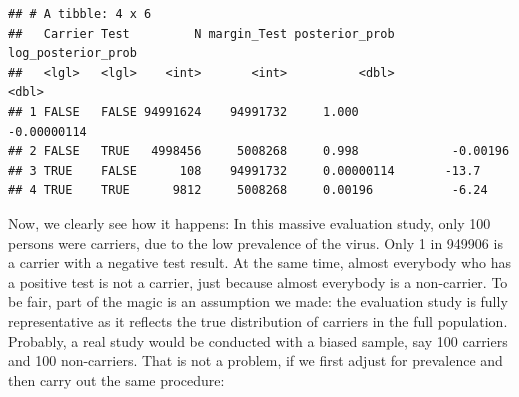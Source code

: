 \documentclass[]{svmono}
\newenvironment{Shaded}{\begin{snugshade}}{\end{snugshade}}
\newcommand{\KeywordTok}[1]{\textcolor[rgb]{0.13,0.29,0.53}{\textbf{#1}}}
\newcommand{\DataTypeTok}[1]{\textcolor[rgb]{0.13,0.29,0.53}{#1}}
\newcommand{\DecValTok}[1]{\textcolor[rgb]{0.00,0.00,0.81}{#1}}
\newcommand{\StringTok}[1]{\textcolor[rgb]{0.31,0.60,0.02}{#1}}
\newcommand{\OperatorTok}[1]{\textcolor[rgb]{0.81,0.36,0.00}{\textbf{#1}}}
\newcommand{\NormalTok}[1]{#1}
\begin{document}
\begin{verbatim}
## # A tibble: 4 x 6
##   Carrier Test         N margin_Test posterior_prob log_posterior_prob
##   <lgl>   <lgl>    <int>       <int>          <dbl>              <dbl>
## 1 FALSE   FALSE 94991624    94991732     1.000             -0.00000114
## 2 FALSE   TRUE   4998456     5008268     0.998             -0.00196   
## 3 TRUE    FALSE      108    94991732     0.00000114       -13.7       
## 4 TRUE    TRUE      9812     5008268     0.00196           -6.24
\end{verbatim}

Now, we clearly see how it happens: In this massive evaluation study,
only 100 persons were carriers, due to the low prevalence of the virus.
Only 1 in 949906 is a carrier with a negative test result. At the same
time, almost everybody who has a positive test is not a carrier, just
because almost everybody is a non-carrier. To be fair, part of the magic
is an assumption we made: the evaluation study is fully representative
as it reflects the true distribution of carriers in the full population.
Probably, a real study would be conducted with a biased sample, say 100
carriers and 100 non-carriers. That is not a problem, if we first adjust
for prevalence and then carry out the same procedure:

\begin{Shaded}
\end{Shaded}
\end{document}
